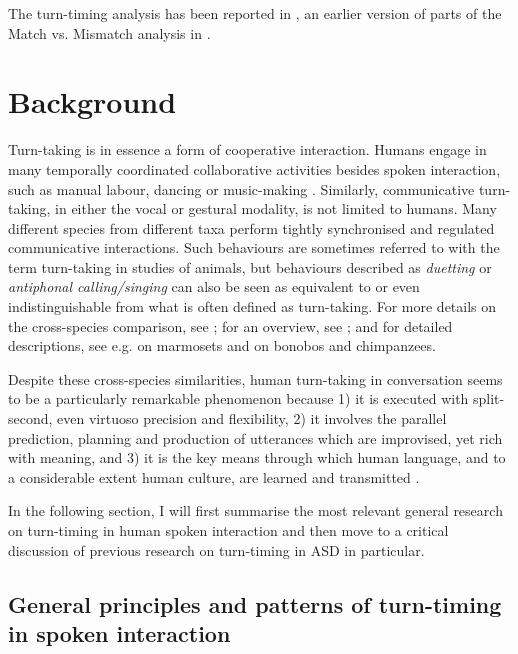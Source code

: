 The turn-timing analysis has been reported in \citet{wehrleTurntimingConversationsAutistic2023}, an earlier version of parts of the Match vs. Mismatch analysis in \citet{janzTurnTransitionsSpectrumConversational2019}.




	\section{Background}\label{sec:turntaking_background}
	
	Turn-taking is in essence a form of cooperative interaction. Humans engage in many temporally coordinated collaborative activities besides spoken interaction, such as manual labour, dancing or music-making \citep[see e.g.][]{hawkinsCommunicativeInteractionSpontaneous2013}. Similarly, communicative turn-taking, in either the vocal or gestural modality, is not limited to humans. Many different species from different taxa perform tightly synchronised and regulated communicative interactions. Such behaviours are sometimes referred to with the term turn-taking in studies of animals, but behaviours described as \textit{duetting} or \textit{antiphonal calling/singing} can also be seen as equivalent to or even indistinguishable from what is often defined as turn-taking. For more details on the cross-species comparison, see \citet{ravignaniInteractiveRhythmsSpecies2019}; for an overview, see \citet{pikaTakingTurnsBridging2018}; and for detailed descriptions, see e.g. \citet{takahashiEarlyDevelopmentTurntaking2016} on marmosets and \citet{frohlichUnpeelingLayersLanguage2016} on bonobos and chimpanzees.
	
	Despite these cross-species similarities, human turn-taking in conversation seems to be a particularly remarkable phenomenon because 1) it is executed with split-second, even virtuoso precision and flexibility, 2) it involves the parallel prediction, planning and production of utterances which are improvised, yet rich with meaning, and 3) it is the key means through which human language, and to a considerable extent human culture, are learned and transmitted \citep[cf.][]{schegloffInteractionInfrastructureSocial2020}.
	
	In the following section, I will first summarise the most relevant general research on turn-timing in human spoken interaction and then move to a critical discussion of previous research on turn-timing in ASD in particular.

 \subsection{General principles and patterns of turn-timing in spoken interaction}\label{turntaking_background_general}

